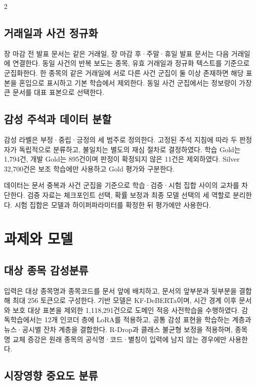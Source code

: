 \documentclass[10pt]{article}
\begin{document}
\begin{multicols}{2}
\subsection{거래일과 사건 정규화}

장 마감 전 발표 문서는 같은 거래일, 장 마감 후·주말·휴일 발표 문서는 다음 거래일에 연결한다. 동일 사건의 반복 보도는 종목, 유효 거래일과 정규화 텍스트를 기준으로 군집화한다. 한 종목의 같은 거래일에 서로 다른 사건 군집이 둘 이상 존재하면 해당 표본을 혼입으로 표시하고 기본 학습에서 제외한다. 동일 사건 군집에서는 정보량이 가장 큰 문서를 대표 표본으로 선택한다.

\subsection{감성 주석과 데이터 분할}

감성 라벨은 부정·중립·긍정의 세 범주로 정의한다. 고정된 주석 지침에 따라 두 판정자가 독립적으로 분류하고, 불일치는 별도의 재심 절차로 결정하였다. 학습 Gold는 1,794건, 개발 Gold는 895건이며 판정이 확정되지 않은 11건은 제외하였다. Silver 32,700건은 보조 학습에만 사용하고 Gold 평가와 구분한다.

데이터는 문서 중복과 사건 군집을 기준으로 학습·검증·시험 집합 사이의 교차를 차단한다. 검증 자료는 체크포인트 선택, 확률 보정과 최종 모델 선택의 세 역할로 분리한다. 시험 집합은 모델과 하이퍼파라미터를 확정한 뒤 평가에만 사용한다.

\section{과제와 모델}

\subsection{대상 종목 감성분류}

입력은 대상 종목명과 종목코드를 문서 앞에 배치하고, 문서의 앞부분과 뒷부분을 결합해 최대 256 토큰으로 구성한다. 기반 모델은 KF-DeBERTa이며, 시간 경계 이후 문서와 보호 대상 표본을 제외한 1,118,291건으로 도메인 적응 사전학습을 수행하였다. 감독학습에서는 12개 인코더 층에 LoRA를 적용하고, 공통 감성 표현을 학습하는 계층과 뉴스·공시별 잔차 계층을 결합한다. R-Drop과 클래스 불균형 보정을 적용하며, 종목명 교체 증강은 원래 종목의 공식명·코드·별칭이 입력에 남지 않는 경우에만 사용한다.

\subsection{시장영향 중요도 분류}


\end{multicols}
\end{document}
